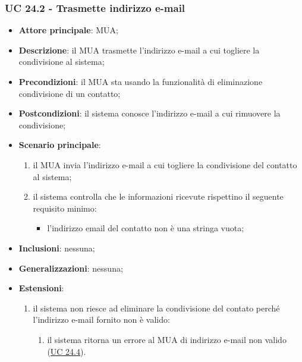     \subsubsection{UC 24.2 - Trasmette indirizzo e-mail} \label{sec:UC24.2}
    \begin{itemize}
        \item \textbf{Attore principale}: MUA;
        \item \textbf{Descrizione}: il MUA trasmette l'indirizzo e-mail a cui togliere la condivisione al sistema;
        \item \textbf{Precondizioni}: il MUA sta usando la funzionalità di eliminazione condivisione di un contatto;
        \item \textbf{Postcondizioni}: il sistema conosce l'indirizzo e-mail a cui rimuovere la condivisione;
        \item \textbf{Scenario principale}:
            \begin{enumerate}
                \item il MUA invia l'indirizzo e-mail a cui togliere la condivisione del contatto al sistema;
                \item il sistema controlla che le informazioni ricevute rispettino il seguente requisito minimo:
                    \begin{itemize}
                        \item l'indirizzo email del contatto non è una stringa vuota;
                    \end{itemize}
            \end{enumerate}
        \item \textbf{Inclusioni}: nessuna;
        \item \textbf{Generalizzazioni}: nessuna;
        \item \textbf{Estensioni}:
            \begin{enumerate}[label=\alph*.]
                \item il sistema non riesce ad eliminare la condivisione del contato perché l'indirizzo e-mail fornito non è valido:
                \begin{enumerate}[label=\arabic*.]
                    \item il sistema ritorna un errore al MUA di indirizzo e-mail non valido (\hyperref[sec:UC24.4]{UC 24.4}).
                \end{enumerate}
            \end{enumerate}
    \end{itemize}


